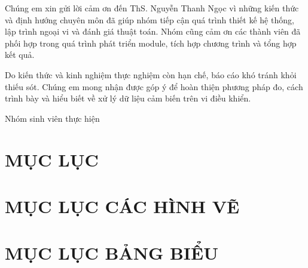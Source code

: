 \documentclass[14pt,a4paper,oneside]{extreport}
\begin{document}
Chúng em xin gửi lời cảm ơn đến ThS. Nguyễn Thanh Ngọc vì những kiến thức và định hướng chuyên môn đã giúp nhóm tiếp cận quá trình thiết kế hệ thống, lập trình ngoại vi và đánh giá thuật toán. Nhóm cũng cảm ơn các thành viên đã phối hợp trong quá trình phát triển module, tích hợp chương trình và tổng hợp kết quả.

Do kiến thức và kinh nghiệm thực nghiệm còn hạn chế, báo cáo khó tránh khỏi thiếu sót. Chúng em mong nhận được góp ý để hoàn thiện phương pháp đo, cách trình bày và hiểu biết về xử lý dữ liệu cảm biến trên vi điều khiển.

\begin{flushright}Nhóm sinh viên thực hiện\end{flushright}
\clearpage
{}
\chapter*{MỤC LỤC}\makeatletter{}\makeatother
\clearpage
\chapter*{MỤC LỤC CÁC HÌNH VẼ}\makeatletter{}\makeatother
\clearpage
\chapter*{MỤC LỤC BẢNG BIỂU}\makeatletter{}\makeatother
\clearpage
\end{document}
